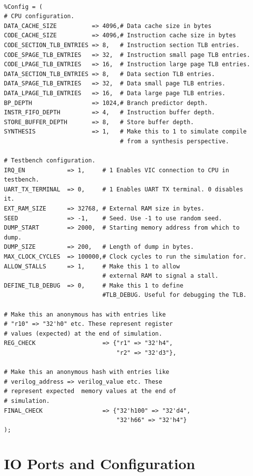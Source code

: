 \documentclass[10pt]{article}
\begin{document}
\begin{lstlisting}[frame=none] % Perl code block start.

%Config = ( 
# CPU configuration.
DATA_CACHE_SIZE          => 4096,# Data cache size in bytes
CODE_CACHE_SIZE          => 4096,# Instruction cache size in bytes
CODE_SECTION_TLB_ENTRIES => 8,   # Instruction section TLB entries.
CODE_SPAGE_TLB_ENTRIES   => 32,  # Instruction small page TLB entries.
CODE_LPAGE_TLB_ENTRIES   => 16,  # Instruction large page TLB entries.
DATA_SECTION_TLB_ENTRIES => 8,   # Data section TLB entries.
DATA_SPAGE_TLB_ENTRIES   => 32,  # Data small page TLB entries.
DATA_LPAGE_TLB_ENTRIES   => 16,  # Data large page TLB entries.
BP_DEPTH                 => 1024,# Branch predictor depth.
INSTR_FIFO_DEPTH         => 4,   # Instruction buffer depth.
STORE_BUFFER_DEPTH       => 8,   # Store buffer depth.
SYNTHESIS                => 1,   # Make this to 1 to simulate compile 
                                 # from a synthesis perspective.

# Testbench configuration.
IRQ_EN            => 1,     # 1 Enables VIC connection to CPU in testbench.
UART_TX_TERMINAL  => 0,     # 1 Enables UART TX terminal. 0 disables it.
EXT_RAM_SIZE      => 32768, # External RAM size in bytes.
SEED              => -1,    # Seed. Use -1 to use random seed.
DUMP_START        => 2000,  # Starting memory address from which to dump.
DUMP_SIZE         => 200,   # Length of dump in bytes.
MAX_CLOCK_CYCLES  => 100000,# Clock cycles to run the simulation for.
ALLOW_STALLS      => 1,     # Make this 1 to allow 
                            # external RAM to signal a stall.
DEFINE_TLB_DEBUG  => 0,     # Make this 1 to define 
                            #TLB_DEBUG. Useful for debugging the TLB.

# Make this an anonymous has with entries like 
# "r10" => "32'h0" etc. These represent register 
# values (expected) at the end of simulation.
REG_CHECK                   => {"r1" => "32'h4", 
                                "r2" => "32'd3"},      

# Make this an anonymous hash with entries like 
# verilog_address => verilog_value etc. These 
# represent expected  memory values at the end of 
# simulation.
FINAL_CHECK                 => {"32'h100" => "32'd4", 
                                "32'h66" => "32'h4"}       
);

\end{lstlisting}

\section{IO Ports and Configuration}
\end{document}
